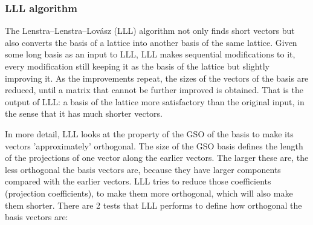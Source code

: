\subsubsection{LLL algorithm}
\label{sec:LLLalgorithm}
The Lenstra–Lenstra–Lovász (LLL) algorithm not only finds short vectors but also
converts the basis of a lattice into another basis of the same lattice. Given
some long basis as an input to LLL, LLL makes sequential
modifications to it, every modification still keeping it as the basis of the
lattice but slightly improving it. As the improvements repeat, the sizes
of the vectors of the basis are reduced, until a matrix that
cannot be further improved is obtained. That is the output of LLL: a basis of the lattice
more satisfactory than the original input, in the sense that it has much
shorter vectors.

In more detail, LLL looks at the property of the GSO of the basis to make its vectors 'approximately' orthogonal. The size of the GSO basis defines the
length of the projections of one vector along the earlier vectors. The larger
these are, the less orthogonal the basis vectors are, because they have larger
components compared with the earlier vectors. LLL tries to reduce those coefficients
(projection coefficients), to make them more orthogonal, which will also make
them shorter. There are 2 tests that LLL performs to define how orthogonal the basis
vectors are:


